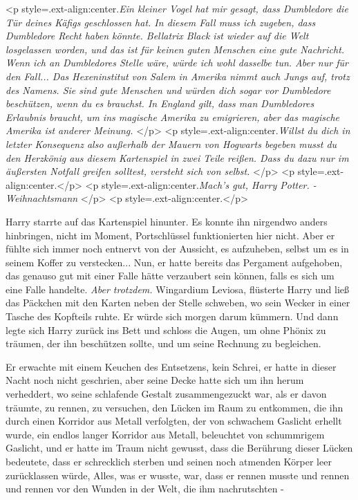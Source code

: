 <p style=\grqq{}.ext-align:center\grqq{}.\emph{Ein kleiner Vogel hat mir gesagt,
dass Dumbledore die Tür deines Käfigs geschlossen hat. In diesem Fall muss ich
zugeben, dass Dumbledore Recht haben könnte. Bellatrix Black ist wieder auf die
Welt losgelassen worden, und das ist für keinen guten Menschen eine gute
Nachricht. Wenn ich an Dumbledores Stelle wäre, würde ich wohl dasselbe tun.
Aber nur für den Fall... Das Hexeninstitut von Salem in Amerika nimmt auch Jungs
auf, trotz des Namens. Sie sind gute Menschen und würden dich sogar vor
Dumbledore beschützen, wenn du es brauchst. In England gilt, dass man
Dumbledores Erlaubnis braucht, um ins magische Amerika zu emigrieren, aber das
magische Amerika ist anderer Meinung.} </p> <p
style=\grqq{}.ext-align:center\grqq{}.\emph{Willst du dich in letzter Konsequenz
also außerhalb der Mauern von Hogwarts begeben musst du den Herzkönig aus diesem
Kartenspiel in zwei Teile reißen. Dass du dazu nur im äußersten Notfall greifen
solltest, versteht sich von selbst.} </p> <p
style=\grqq{}.ext-align:center\grqq{}.</p> <p
style=\grqq{}.ext-align:center\grqq{}.\emph{Mach's gut, Harry Potter. -
Weihnachtsmann} </p> <p style=\grqq{}.ext-align:center\grqq{}.</p>

Harry starrte auf das Kartenspiel hinunter. Es konnte ihn nirgendwo anders
hinbringen, nicht im Moment, Portschlüssel funktionierten hier nicht. Aber er
fühlte sich immer noch entnervt von der Aussicht, es aufzuheben, selbst um es in
seinem Koffer zu verstecken... Nun, er hatte bereits das Pergament aufgehoben,
das genauso gut mit einer Falle hätte verzaubert sein können, falls es sich um
eine Falle handelte. \emph{Aber trotzdem.} \glqq{}Wingardium Leviosa\grqq{},
flüsterte Harry und ließ das Päckchen mit den Karten neben der Stelle schweben,
wo sein Wecker in einer Tasche des Kopfteils ruhte. Er würde sich morgen darum
kümmern. Und dann legte sich Harry zurück ins Bett und schloss die Augen, um
ohne Phönix zu träumen, der ihn beschützen sollte, und um seine Rechnung zu
begleichen.

Er erwachte mit einem Keuchen des Entsetzens, kein Schrei, er hatte in dieser
Nacht noch nicht geschrien, aber seine Decke hatte sich um ihn herum verheddert,
wo seine schlafende Gestalt zusammengezuckt war, als er davon träumte, zu
rennen, zu versuchen, den Lücken im Raum zu entkommen, die ihn durch einen
Korridor aus Metall verfolgten, der von schwachem Gaslicht erhellt wurde, ein
endlos langer Korridor aus Metall, beleuchtet von schummrigem Gaslicht, und er
hatte im Traum nicht gewusst, dass die Berührung dieser Lücken bedeutete, dass
er schrecklich sterben und seinen noch atmenden Körper leer zurücklassen würde,
Alles, was er wusste, war, dass er rennen musste und rennen und rennen vor den
Wunden in der Welt, die ihm nachrutschten -

